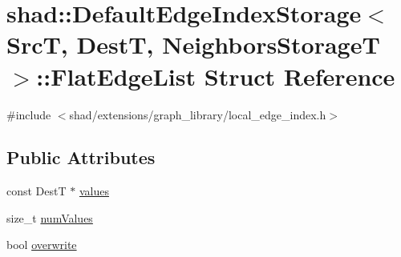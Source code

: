 \hypertarget{structshad_1_1DefaultEdgeIndexStorage_1_1FlatEdgeList}{\section{shad\-:\-:Default\-Edge\-Index\-Storage$<$ Src\-T, Dest\-T, Neighbors\-Storage\-T $>$\-:\-:Flat\-Edge\-List Struct Reference}
\label{structshad_1_1DefaultEdgeIndexStorage_1_1FlatEdgeList}
}


{\ttfamily \#include $<$shad/extensions/graph\-\_\-library/local\-\_\-edge\-\_\-index.\-h$>$}

\subsection*{Public Attributes}
\begin{DoxyCompactItemize}
\item 
const Dest\-T $\ast$ \hyperlink{structshad_1_1DefaultEdgeIndexStorage_1_1FlatEdgeList_af5d56fe152a408435852906579557af1}{values}
\item 
size\-\_\-t \hyperlink{structshad_1_1DefaultEdgeIndexStorage_1_1FlatEdgeList_ad805a1579ec182e2ad5878268e3aee7d}{num\-Values}
\item 
bool \hyperlink{structshad_1_1DefaultEdgeIndexStorage_1_1FlatEdgeList_ac3b2113ea27e01418d7f910bb39f6512}{overwrite}
\end{DoxyCompactItemize}


